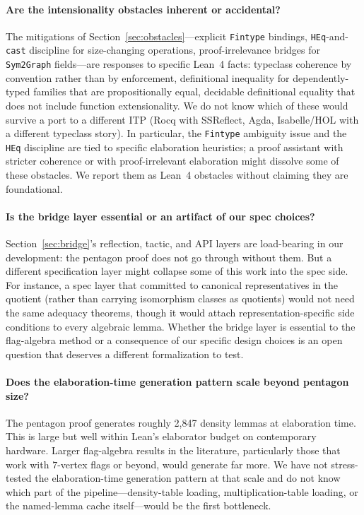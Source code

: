 \documentclass{article}
\newcommand{\lean}[1]{\texttt{#1}}
\begin{document}
\paragraph{Are the intensionality obstacles inherent or accidental?}
The mitigations of Section~\ref{sec:obstacles}---explicit \lean{Fintype}
bindings, \lean{HEq}-and-\lean{cast} discipline for size-changing operations,
proof-irrelevance bridges for \lean{Sym2Graph} fields---are responses to
specific Lean~4 facts: typeclass coherence by convention rather than by
enforcement, definitional inequality for dependently-typed families that are
propositionally equal, decidable definitional equality that does not include
function extensionality.  We do not know which of these would survive a port
to a different ITP (Rocq with SSReflect, Agda, Isabelle/HOL with a different
typeclass story).  In particular, the \lean{Fintype} ambiguity issue and the
\lean{HEq} discipline are tied to specific elaboration heuristics; a
proof assistant with stricter coherence or with proof-irrelevant elaboration
might dissolve some of these obstacles.  We report them as Lean~4 obstacles
without claiming they are foundational.

\paragraph{Is the bridge layer essential or an artifact of our spec choices?}
Section~\ref{sec:bridge}'s reflection, tactic, and API layers are
load-bearing in our development: the pentagon proof does not go through
without them.  But a different specification layer might collapse some of
this work into the spec side.  For instance, a spec layer that committed to
canonical representatives in the quotient (rather than carrying isomorphism
classes as quotients) would not need the same adequacy theorems, though it
would attach representation-specific side conditions to every algebraic
lemma.  Whether the bridge layer is essential to the flag-algebra method or
a consequence of our specific design choices is an open question that
deserves a different formalization to test.

\paragraph{Does the elaboration-time generation pattern scale beyond
pentagon size?}
The pentagon proof generates roughly 2,847 density lemmas at elaboration
time.  This is large but well within Lean's elaborator budget on contemporary
hardware.  Larger flag-algebra results in the literature, particularly those
that work with $7$-vertex flags or beyond, would generate far more.  We have
not stress-tested the elaboration-time generation pattern at that scale and
do not know which part of the pipeline---density-table loading,
multiplication-table loading, or the named-lemma cache itself---would be the
first bottleneck.
\end{document}
